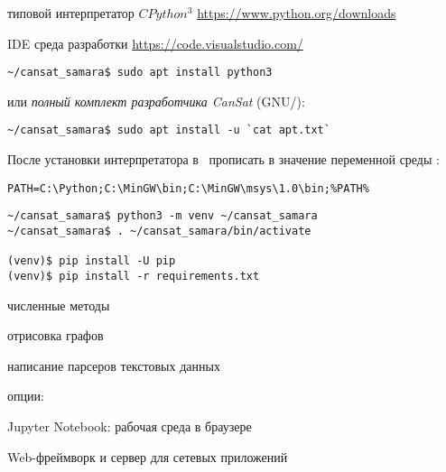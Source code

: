\label{pyinst}\secdown

\begin{description}
    \item{типовой интерпретатор $CPython^3$} \url{https://www.python.org/downloads}
    \item{IDE среда разработки} \url{https://code.visualstudio.com/}
\end{description}

\begin{verbatim}
~/cansat_samara$ sudo apt install python3
\end{verbatim}
или \emph{полный комплект разработчика CanSat} (GNU/\linux):
\begin{verbatim}
~/cansat_samara$ sudo apt install -u `cat apt.txt`
\end{verbatim}

\noindent
После установки интерпретатора в \win\ прописать в 
значение переменной среды :
\begin{verbatim}
PATH=C:\Python;C:\MinGW\bin;C:\MinGW\msys\1.0\bin;%PATH%
\end{verbatim}


\begin{verbatim}
~/cansat_samara$ python3 -m venv ~/cansat_samara
~/cansat_samara$ . ~/cansat_samara/bin/activate

(venv)$ pip install -U pip
(venv)$ pip install -r requirements.txt
\end{verbatim}

\begin{description}
    \item{}     численные методы
    \item{}  отрисовка графов
    \item{}       написание парсеров текстовых данных
\end{description}

опции:

\begin{description}
    \item{}   Jupyter Notebook: рабочая среда в браузере
    \item{}     Web-фреймворк и сервер для сетевых приложений
\end{description}
    
\secup
